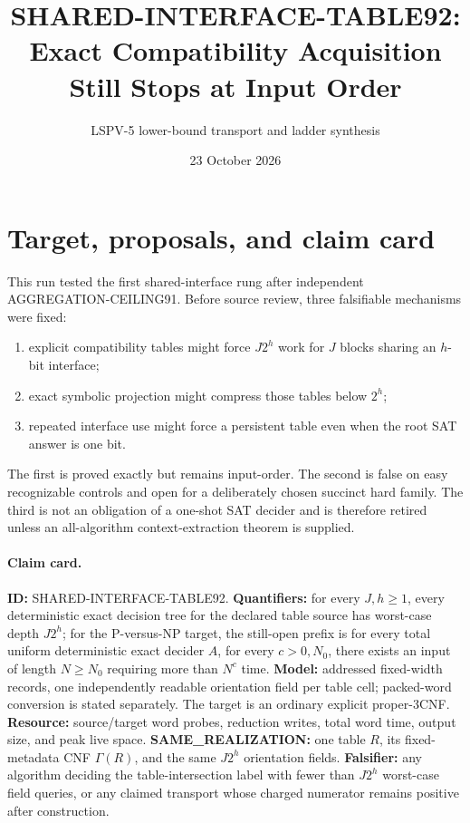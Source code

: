 \documentclass[11pt]{article}
\title{SHARED-INTERFACE-TABLE92:\\Exact Compatibility Acquisition Still Stops at Input Order}
\author{LSPV-5 lower-bound transport and ladder synthesis}
\date{23 October 2026}
\begin{document}
\maketitle

\begin{center}
\end{center}

\section{Target, proposals, and claim card}

This run tested the first shared-interface rung after independent
AGGREGATION-CEILING91.  Before source review, three falsifiable mechanisms
were fixed:
\begin{enumerate}
\item explicit compatibility tables might force $J2^h$ work for $J$ blocks
sharing an $h$-bit interface;
\item exact symbolic projection might compress those tables below $2^h$;
\item repeated interface use might force a persistent table even when the
root SAT answer is one bit.
\end{enumerate}
The first is proved exactly but remains input-order.  The second is false on
easy recognizable controls and open for a deliberately chosen succinct hard
family.  The third is not an obligation of a one-shot SAT decider and is
therefore retired unless an all-algorithm context-extraction theorem is
supplied.

\paragraph{Claim card.}
\textbf{ID:} SHARED-INTERFACE-TABLE92.
\textbf{Quantifiers:} for every $J,h\ge1$, every deterministic exact
decision tree for the declared table source has worst-case depth $J2^h$;
for the P-versus-NP target, the still-open prefix is for every total uniform
deterministic exact decider $A$, for every $c>0,N_0$, there exists an input
of length $N\ge N_0$ requiring more than $N^c$ time.
\textbf{Model:} addressed fixed-width records, one independently readable
orientation field per table cell; packed-word conversion is stated
separately.  The target is an ordinary explicit proper-3CNF.
\textbf{Resource:} source/target word probes, reduction writes, total word
time, output size, and peak live space.
\textbf{SAME\_REALIZATION:} one table $R$, its fixed-metadata CNF
$\Gamma(R)$, and the same $J2^h$ orientation fields.
\textbf{Falsifier:} any algorithm deciding the table-intersection label
with fewer than $J2^h$ worst-case field queries, or any claimed transport
whose charged numerator remains positive after construction.
\end{document}
